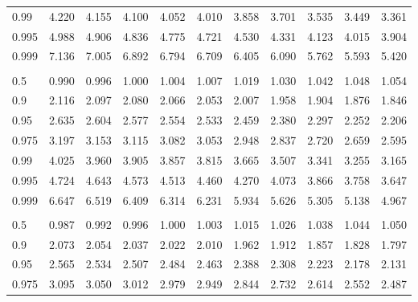 \documentclass[
]{article}
\begin{document}
\begin{table}[H]
\begin{tabular}{lrrrrrrrrrr}
\hspace{1em}0.99 & 4.220 & 4.155 & 4.100 & 4.052 & 4.010 & 3.858 & 3.701 & 3.535 & 3.449 & 3.361\\
\hspace{1em}0.995 & 4.988 & 4.906 & 4.836 & 4.775 & 4.721 & 4.530 & 4.331 & 4.123 & 4.015 & 3.904\\
\hspace{1em}0.999 & 7.136 & 7.005 & 6.892 & 6.794 & 6.709 & 6.405 & 6.090 & 5.762 & 5.593 & 5.420\\
\addlinespace[0.3em]
\multicolumn{11}{l}{\textbf{$k_2=13$}}\\
\hspace{1em}0.5 & 0.990 & 0.996 & 1.000 & 1.004 & 1.007 & 1.019 & 1.030 & 1.042 & 1.048 & 1.054\\
\hspace{1em}0.9 & 2.116 & 2.097 & 2.080 & 2.066 & 2.053 & 2.007 & 1.958 & 1.904 & 1.876 & 1.846\\
\hspace{1em}0.95 & 2.635 & 2.604 & 2.577 & 2.554 & 2.533 & 2.459 & 2.380 & 2.297 & 2.252 & 2.206\\
\hspace{1em}0.975 & 3.197 & 3.153 & 3.115 & 3.082 & 3.053 & 2.948 & 2.837 & 2.720 & 2.659 & 2.595\\
\hspace{1em}0.99 & 4.025 & 3.960 & 3.905 & 3.857 & 3.815 & 3.665 & 3.507 & 3.341 & 3.255 & 3.165\\
\hspace{1em}0.995 & 4.724 & 4.643 & 4.573 & 4.513 & 4.460 & 4.270 & 4.073 & 3.866 & 3.758 & 3.647\\
\hspace{1em}0.999 & 6.647 & 6.519 & 6.409 & 6.314 & 6.231 & 5.934 & 5.626 & 5.305 & 5.138 & 4.967\\
\addlinespace[0.3em]
\multicolumn{11}{l}{\textbf{$k_2=14$}}\\
\hspace{1em}0.5 & 0.987 & 0.992 & 0.996 & 1.000 & 1.003 & 1.015 & 1.026 & 1.038 & 1.044 & 1.050\\
\hspace{1em}0.9 & 2.073 & 2.054 & 2.037 & 2.022 & 2.010 & 1.962 & 1.912 & 1.857 & 1.828 & 1.797\\
\hspace{1em}0.95 & 2.565 & 2.534 & 2.507 & 2.484 & 2.463 & 2.388 & 2.308 & 2.223 & 2.178 & 2.131\\
\hspace{1em}0.975 & 3.095 & 3.050 & 3.012 & 2.979 & 2.949 & 2.844 & 2.732 & 2.614 & 2.552 & 2.487\\

\end{tabular}
\end{table}
\end{document}
